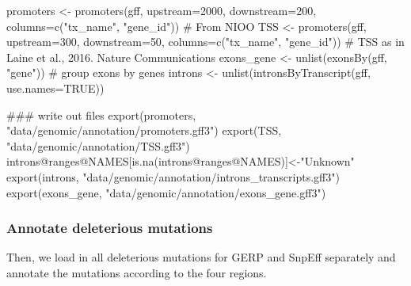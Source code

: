 \documentclass[
  letterpaper,
  DIV=11,
  numbers=noendperiod]{scrreprt}
\newenvironment{Shaded}{}{}
\newcommand{\AttributeTok}[1]{\textcolor[rgb]{0.84,0.23,0.29}{#1}}
\newcommand{\CommentTok}[1]{\textcolor[rgb]{0.42,0.45,0.49}{#1}}
\newcommand{\ConstantTok}[1]{\textcolor[rgb]{0.00,0.36,0.77}{#1}}
\newcommand{\DecValTok}[1]{\textcolor[rgb]{0.00,0.36,0.77}{#1}}
\newcommand{\DocumentationTok}[1]{\textcolor[rgb]{0.42,0.45,0.49}{#1}}
\newcommand{\FunctionTok}[1]{\textcolor[rgb]{0.44,0.26,0.76}{#1}}
\newcommand{\NormalTok}[1]{\textcolor[rgb]{0.14,0.16,0.18}{#1}}
\newcommand{\OtherTok}[1]{\textcolor[rgb]{0.44,0.26,0.76}{#1}}
\newcommand{\SpecialCharTok}[1]{\textcolor[rgb]{0.00,0.36,0.77}{#1}}
\newcommand{\StringTok}[1]{\textcolor[rgb]{0.01,0.18,0.38}{#1}}
\begin{document}
\begin{Shaded}
\begin{Highlighting}[]
\NormalTok{promoters }\OtherTok{\textless{}{-}} \FunctionTok{promoters}\NormalTok{(gff, }\AttributeTok{upstream=}\DecValTok{2000}\NormalTok{, }\AttributeTok{downstream=}\DecValTok{200}\NormalTok{, }\AttributeTok{columns=}\FunctionTok{c}\NormalTok{(}\StringTok{"tx\_name"}\NormalTok{, }\StringTok{"gene\_id"}\NormalTok{)) }\CommentTok{\# From NIOO}
\NormalTok{TSS }\OtherTok{\textless{}{-}} \FunctionTok{promoters}\NormalTok{(gff, }\AttributeTok{upstream=}\DecValTok{300}\NormalTok{, }\AttributeTok{downstream=}\DecValTok{50}\NormalTok{, }\AttributeTok{columns=}\FunctionTok{c}\NormalTok{(}\StringTok{"tx\_name"}\NormalTok{, }\StringTok{"gene\_id"}\NormalTok{)) }\CommentTok{\# TSS as in Laine et al., 2016. Nature Communications}
\NormalTok{exons\_gene }\OtherTok{\textless{}{-}} \FunctionTok{unlist}\NormalTok{(}\FunctionTok{exonsBy}\NormalTok{(gff, }\StringTok{"gene"}\NormalTok{)) }\CommentTok{\# group exons by genes}
\NormalTok{introns }\OtherTok{\textless{}{-}} \FunctionTok{unlist}\NormalTok{(}\FunctionTok{intronsByTranscript}\NormalTok{(gff, }\AttributeTok{use.names=}\ConstantTok{TRUE}\NormalTok{))}

\DocumentationTok{\#\#\# write out files}
\FunctionTok{export}\NormalTok{(promoters, }\StringTok{"data/genomic/annotation/promoters.gff3"}\NormalTok{)}
\FunctionTok{export}\NormalTok{(TSS, }\StringTok{"data/genomic/annotation/TSS.gff3"}\NormalTok{)}
\NormalTok{introns}\SpecialCharTok{@}\NormalTok{ranges}\SpecialCharTok{@}\NormalTok{NAMES[}\FunctionTok{is.na}\NormalTok{(introns}\SpecialCharTok{@}\NormalTok{ranges}\SpecialCharTok{@}\NormalTok{NAMES)]}\OtherTok{\textless{}{-}}\StringTok{"Unknown"}
\FunctionTok{export}\NormalTok{(introns, }\StringTok{"data/genomic/annotation/introns\_transcripts.gff3"}\NormalTok{)}
\FunctionTok{export}\NormalTok{(exons\_gene, }\StringTok{"data/genomic/annotation/exons\_gene.gff3"}\NormalTok{)}
\end{Highlighting}
\end{Shaded}

\hypertarget{annotate-deleterious-mutations}{%
\subsubsection{Annotate deleterious
mutations}\label{annotate-deleterious-mutations}}

Then, we load in all deleterious mutations for GERP and SnpEff
separately and annotate the mutations according to the four regions.
\end{document}
